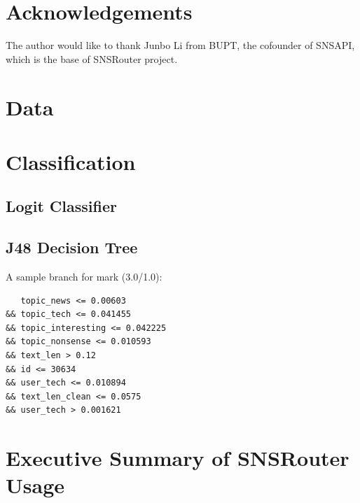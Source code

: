 \documentclass{sig-alternate}
\begin{document}
\section*{Acknowledgements}
\label{sec:Acknowledgements}

The author would like to thank Junbo Li from BUPT, 
the cofounder of SNSAPI, 
which is the base of SNSRouter project. 





\appendix 

\section{Data}
\label{sec:Data}

\section{Classification}
\label{sec:Classification}

\subsection{Logit Classifier}
\label{sec:Logit Classifier}

\subsection{J48 Decision Tree}
\label{sec:J48 Decision Tree}

A sample branch for mark (3.0/1.0):

\begin{Verbatim}
   topic_news <= 0.00603 
&& topic_tech <= 0.041455
&& topic_interesting <= 0.042225 
&& topic_nonsense <= 0.010593 
&& text_len > 0.12 
&& id <= 30634 
&& user_tech <= 0.010894 
&& text_len_clean <= 0.0575
&& user_tech > 0.001621
\end{Verbatim}

\section{Executive Summary of SNSRouter Usage}
\label{sec:Executive Summary of SNSRouter Usage}




\end{document}
